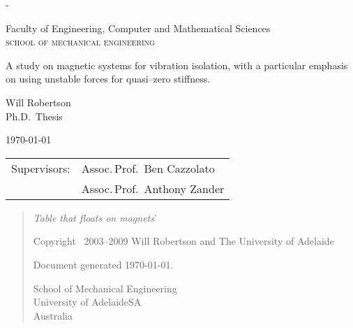
\thispagestyle{empty}
\label{titlepage}
\calccentering{\unitlength}
\begin{adjustwidth*}{\unitlength}{-\unitlength} 
\setlength{\parindent}{0pt}

\Large

\begin{flushright}
\end{flushright}

\vfill

Faculty of Engineering, Computer and Mathematical Sciences\\
\textsc{\MakeLowercase{SCHOOL OF MECHANICAL ENGINEERING}}

\vfill

{\Large\raggedright 
A study on magnetic systems for
vibration isolation, with a particular
emphasis on using unstable forces for
quasi--zero stiffness.
}
\vspace{10mm}

Will Robertson\\
Ph.D.\ Thesis
\vspace{10mm}

\today

\vfill

\vfill
    
\begin{tabular}{@{}ll}
Supervisors:    & Assoc.\,Prof.\ Ben Cazzolato  \\
                & Assoc.\,Prof.\ Anthony Zander
\end{tabular}
\end{adjustwidth*}

\newpage
\thispagestyle{empty}
\null
\vfill
\begin{quote} 
  \LARGE
  \textit{Table that floats on magnets}'

  \vfill
  \normalsize
  \raggedright
  Copyright \textcopyright\ 2003--2009 Will Robertson 
  and The University of Adelaide

  \bigskip
  Document generated \today.

  \bigskip
  School of Mechanical Engineering\\
  University of Adelaide\quad SA\\
  Australia\\
\end{quote}

